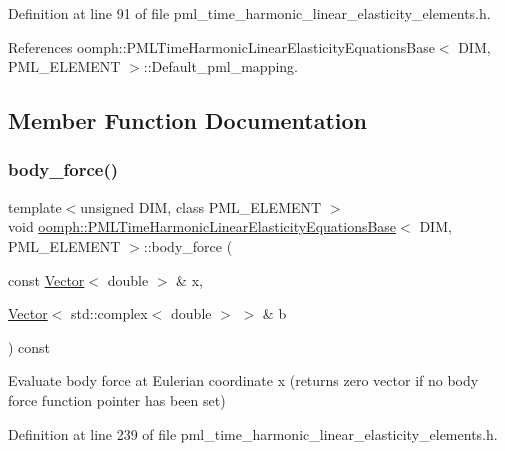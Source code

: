 Definition at line 91 of file pml\+\_\+time\+\_\+harmonic\+\_\+linear\+\_\+elasticity\+\_\+elements.\+h.



References oomph\+::\+P\+M\+L\+Time\+Harmonic\+Linear\+Elasticity\+Equations\+Base$<$ D\+I\+M, P\+M\+L\+\_\+\+E\+L\+E\+M\+E\+N\+T $>$\+::\+Default\+\_\+pml\+\_\+mapping.



\subsection{Member Function Documentation}
\mbox{\label{classoomph_1_1PMLTimeHarmonicLinearElasticityEquationsBase_ae2f78d99ea705a3df9f8d2f6f952eb90}} 
\subsubsection{\texorpdfstring{body\+\_\+force()}{body\_force()}}
{\footnotesize\ttfamily template$<$unsigned D\+IM, class P\+M\+L\+\_\+\+E\+L\+E\+M\+E\+NT $>$ \\
void \hyperlink{classoomph_1_1PMLTimeHarmonicLinearElasticityEquationsBase}{oomph\+::\+P\+M\+L\+Time\+Harmonic\+Linear\+Elasticity\+Equations\+Base}$<$ D\+IM, P\+M\+L\+\_\+\+E\+L\+E\+M\+E\+NT $>$\+::body\+\_\+force (\begin{DoxyParamCaption}\item[{const \hyperlink{classoomph_1_1Vector}{Vector}$<$ double $>$ \&}]{x,  }\item[{\hyperlink{classoomph_1_1Vector}{Vector}$<$ std\+::complex$<$ double $>$ $>$ \&}]{b }\end{DoxyParamCaption}) const\hspace{0.3cm}{\ttfamily [inline]}}



Evaluate body force at Eulerian coordinate x (returns zero vector if no body force function pointer has been set) 



Definition at line 239 of file pml\+\_\+time\+\_\+harmonic\+\_\+linear\+\_\+elasticity\+\_\+elements.\+h.



